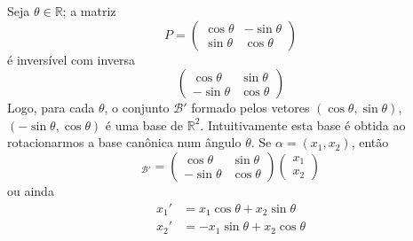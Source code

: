 \begin{exemplo*}
  Seja $\theta \in {\mathbb{R}}$; a matriz 
   \begin{equation*}
     P = 
     \begin{pmatrix}
        \cos{\theta} & -\sin{\theta}\\
        \sin{\theta} & \cos{\theta}
     \end{pmatrix}
  \end{equation*}
  é inversível com inversa
  \begin{equation*}
     \begin{pmatrix}
        \cos{\theta} & \sin{\theta}\\
        -\sin{\theta} & \cos{\theta}
     \end{pmatrix}
  \end{equation*}
  Logo, para cada $\theta$, o conjunto ${\mathcal{B}}'$ formado pelos vetores $(\cos{\theta}, \sin{\theta})$, $(-\sin{\theta}, \cos{\theta})$ é uma base de ${\mathbb{R}}^2$. Intuitivamente esta base é obtida ao rotacionarmos a base canônica num ângulo $\theta$. Se $\alpha =(x_1,x_2)$, então
  \begin{equation*}
     [\alpha]_{{\mathcal{B}}'} = 
     \begin{pmatrix}
        \cos{\theta} & \sin{\theta}\\
        -\sin{\theta} &\cos{\theta}
     \end{pmatrix}
     \begin{pmatrix}
        x_1\\x_2
     \end{pmatrix}
  \end{equation*}
  ou ainda
  \begin{align*}
    x_1' &= x_1\cos{\theta}+x_2\sin{\theta}\\
    x_2' &= -x_1\sin{\theta}+x_2\cos{\theta}      
  \end{align*}
\end{exemplo*}
